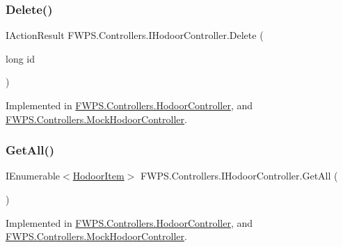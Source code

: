 \subsubsection{\texorpdfstring{Delete()}{Delete()}}
{\footnotesize\ttfamily I\+Action\+Result F\+W\+P\+S.\+Controllers.\+I\+Hodoor\+Controller.\+Delete (\begin{DoxyParamCaption}\item[{long}]{id }\end{DoxyParamCaption})}



Implemented in \mbox{\hyperlink{class_f_w_p_s_1_1_controllers_1_1_hodoor_controller_aa0b89f247140f77be91067dd79d68345}{F\+W\+P\+S.\+Controllers.\+Hodoor\+Controller}}, and \mbox{\hyperlink{class_f_w_p_s_1_1_controllers_1_1_mock_hodoor_controller_acc10e4e343e001fa52671c3863798652}{F\+W\+P\+S.\+Controllers.\+Mock\+Hodoor\+Controller}}.

\mbox{\label{interface_f_w_p_s_1_1_controllers_1_1_i_hodoor_controller_ac50e7afd931ca1f16f767cac2fae488e}} 
\subsubsection{\texorpdfstring{Get\+All()}{GetAll()}}
{\footnotesize\ttfamily I\+Enumerable$<$\mbox{\hyperlink{class_f_w_p_s_1_1_models_1_1_hodoor_item}{Hodoor\+Item}}$>$ F\+W\+P\+S.\+Controllers.\+I\+Hodoor\+Controller.\+Get\+All (\begin{DoxyParamCaption}{ }\end{DoxyParamCaption})}



Implemented in \mbox{\hyperlink{class_f_w_p_s_1_1_controllers_1_1_hodoor_controller_a862b9ad647c5e0ff7fda5dd5f359a040}{F\+W\+P\+S.\+Controllers.\+Hodoor\+Controller}}, and \mbox{\hyperlink{class_f_w_p_s_1_1_controllers_1_1_mock_hodoor_controller_a503cc2c82dc1892cc9c0358054b6b5df}{F\+W\+P\+S.\+Controllers.\+Mock\+Hodoor\+Controller}}.

\mbox{\label{interface_f_w_p_s_1_1_controllers_1_1_i_hodoor_controller_a7676bf587ad504f1e5e7c1802f964489}} 
